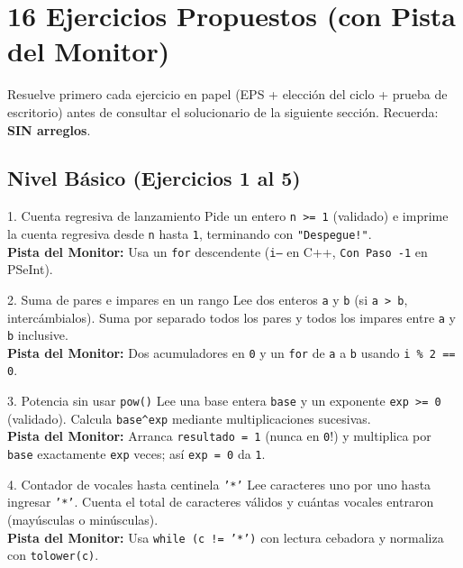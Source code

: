 \documentclass[11pt,letterpaper]{article}
\begin{document}
\section{16 Ejercicios Propuestos (con Pista del Monitor)}

Resuelve primero cada ejercicio en papel (EPS + elección del ciclo + prueba de escritorio) antes de consultar el solucionario de la siguiente sección. Recuerda: \textbf{SIN arreglos}.

\subsection{Nivel Básico (Ejercicios 1 al 5)}

\begin{ejercicio}{1. Cuenta regresiva de lanzamiento}
Pide un entero \texttt{n >= 1} (validado) e imprime la cuenta regresiva desde \texttt{n} hasta \texttt{1}, terminando con \texttt{"Despegue!"}.\\
\textbf{Pista del Monitor:} Usa un \texttt{for} descendente (\texttt{i--} en C++, \texttt{Con Paso -1} en PSeInt).
\end{ejercicio}

\begin{ejercicio}{2. Suma de pares e impares en un rango}
Lee dos enteros \texttt{a} y \texttt{b} (si \texttt{a > b}, intercámbialos). Suma por separado todos los pares y todos los impares entre \texttt{a} y \texttt{b} inclusive.\\
\textbf{Pista del Monitor:} Dos acumuladores en \texttt{0} y un \texttt{for} de \texttt{a} a \texttt{b} usando \texttt{i \% 2 == 0}.
\end{ejercicio}

\begin{ejercicio}{3. Potencia sin usar \texttt{pow()}}
Lee una base entera \texttt{base} y un exponente \texttt{exp >= 0} (validado). Calcula \texttt{base\textasciicircum exp} mediante multiplicaciones sucesivas.\\
\textbf{Pista del Monitor:} Arranca \texttt{resultado = 1} (nunca en \texttt{0}!) y multiplica por \texttt{base} exactamente \texttt{exp} veces; así \texttt{exp = 0} da \texttt{1}.
\end{ejercicio}

\begin{ejercicio}{4. Contador de vocales hasta centinela \texttt{'*'}}
Lee caracteres uno por uno hasta ingresar \texttt{'*'}. Cuenta el total de caracteres válidos y cuántas vocales entraron (mayúsculas o minúsculas).\\
\textbf{Pista del Monitor:} Usa \texttt{while (c != '*')} con lectura cebadora y normaliza con \texttt{tolower(c)}.
\end{ejercicio}
\end{document}
